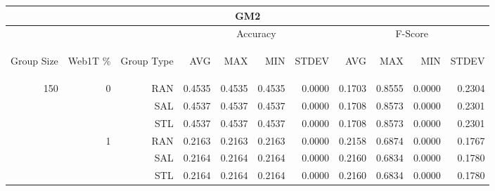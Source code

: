 \begin{center}
\begin{table}[htbp]
\begin{tabular}{ | r | r | r | r | r | r | r | r | r | r | r |}
\hline
\multicolumn{11}{|c|}{GM2}\\
\hline
 & & & \multicolumn{4}{|c|}{Accuracy} & \multicolumn{4}{|c|}{F-Score}\\ \cline{4-11}
\begin{sideways}Group Size\end{sideways} & \begin{sideways}Web1T \%\end{sideways} & \begin{sideways}Group Type\end{sideways} & \begin{sideways}AVG\end{sideways} & \begin{sideways}MAX\end{sideways} & \begin{sideways}MIN\end{sideways} & \begin{sideways}STDEV\end{sideways} & \begin{sideways}AVG\end{sideways} & \begin{sideways}MAX\end{sideways} & \begin{sideways}MIN\end{sideways} & \begin{sideways}STDEV\end{sideways}\\
\hline
\multirow{18}{*}{150}
 & \multirow{3}{*}{0} & RAN & 0.4535 & 0.4535 & 0.4535 & 0.0000 & 0.1703 & 0.8555 & 0.0000 & 0.2304\\ \cline{3-11}
 &   & SAL & 0.4537 & 0.4537 & 0.4537 & 0.0000 & 0.1708 & 0.8573 & 0.0000 & 0.2301\\ \cline{3-11}
 &   & STL & 0.4537 & 0.4537 & 0.4537 & 0.0000 & 0.1708 & 0.8573 & 0.0000 & 0.2301\\ \cline{2-11}
 & \multirow{3}{*}{1} & RAN & 0.2163 & 0.2163 & 0.2163 & 0.0000 & 0.2158 & 0.6874 & 0.0000 & 0.1767\\ \cline{3-11}
 &   & SAL & 0.2164 & 0.2164 & 0.2164 & 0.0000 & 0.2160 & 0.6834 & 0.0000 & 0.1780\\ \cline{3-11}
 &   & STL & 0.2164 & 0.2164 & 0.2164 & 0.0000 & 0.2160 & 0.6834 & 0.0000 & 0.1780\\ \cline{2-11}

\end{tabular}
\end{table}
\end{center}
